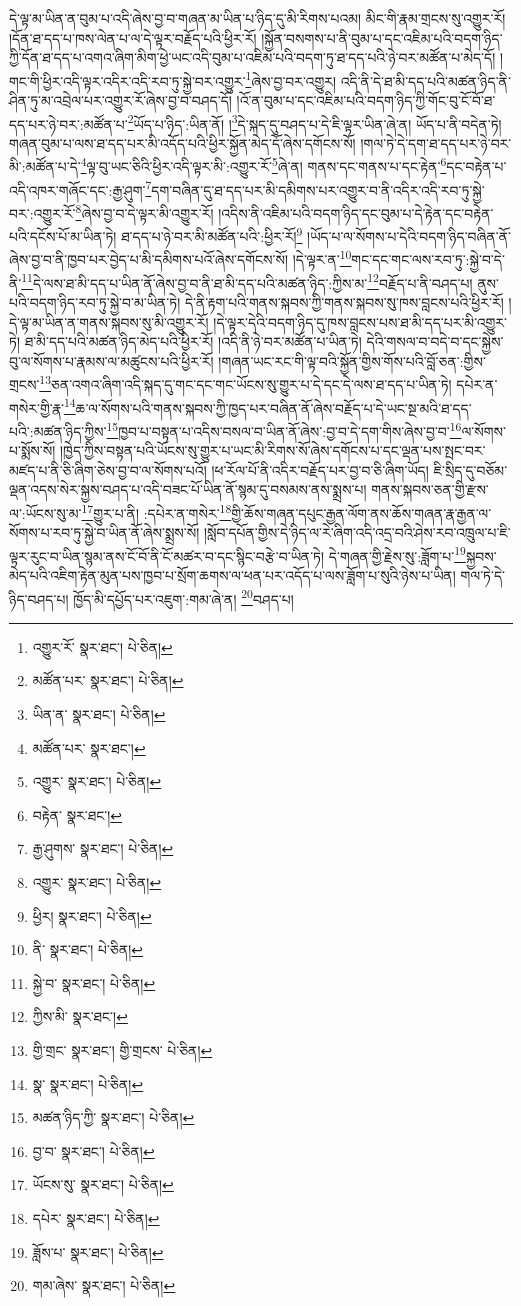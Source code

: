 དེ་ལྟ་མ་ཡིན་ན་བུམ་པ་འདི་ཞེས་བྱ་བ་གཞན་མ་ཡིན་པ་ཉིད་དུ་མི་རིགས་པའམ། མིང་གི་རྣམ་གྲངས་སུ་འགྱུར་རོ། །དོན་ཐ་དད་པ་ཁས་ལེན་པ་ལ་དེ་ལྟར་བརྗོད་པའི་ཕྱིར་རོ། །སྐྱོན་བསགས་པ་ནི་བུམ་པ་དང་འཇིམ་པའི་བདག་ཉིད་ཀྱི་དོན་ཐ་དད་པ་འགའ་ཞིག་མིག་ཕྱེ་ཡང་འདི་བུམ་པ་འཇིམ་པའི་བདག་ཏུ་ཐ་དད་པའི་ཉེ་བར་མཚོན་པ་མེད་དོ། །གང་གི་ཕྱིར་འདི་ལྟར་འདིར་འདི་རབ་ཏུ་སྐྱེ་བར་འགྱུར་\footnote{འགྱུར་རོ་  སྣར་ཐང་།  པེ་ཅིན། }ཞེས་བྱ་བར་འགྱུར། འདི་ནི་དེ་ཐ་མི་དད་པའི་མཚན་ཉིད་ནི་ཤིན་ཏུ་མ་འབྲེལ་པར་འགྱུར་རོ་ཞེས་བྱ་བ་བཤད་དོ། །འོ་ན་བུམ་པ་དང་འཇིམ་པའི་བདག་ཉིད་ཀྱི་གོང་བུ་ངོ་བོ་ཐ་དད་པར་ཉེ་བར་:མཚོན་པ་\footnote{མཚོན་པར་  སྣར་ཐང་།  པེ་ཅིན། }ཡོད་པ་ཉིད་:ཡིན་ནོ། །\footnote{ཡིན་ན་  སྣར་ཐང་།  པེ་ཅིན། }དེ་སྐད་དུ་བཤད་པ་དེ་ཇི་ལྟར་ཡིན་ཞེ་ན། ཡོད་པ་ནི་བདེན་ཏེ། གཞན་བུམ་པ་ལས་ཐ་དད་པར་མི་འདོད་པའི་ཕྱིར་སྐྱོན་མེད་དོ་ཞེས་དགོངས་སོ། །གལ་ཏེ་དེ་དག་ཐ་དད་པར་ཉེ་བར་མི་:མཚོན་པ་དེ་\footnote{མཚོན་པར་  སྣར་ཐང་། }ལྟ་བུ་ཡང་ཅིའི་ཕྱིར་འདི་ལྟར་མི་:འགྱུར་རོ་\footnote{འགྱུར་  སྣར་ཐང་།  པེ་ཅིན། }ཞེ་ན། གནས་དང་གནས་པ་དང་རྟེན་\footnote{བརྟེན་  སྣར་ཐང་། }དང་བརྟེན་པ་འདི་འཁར་གཞོང་དང་:རྒྱ་ཤུག་\footnote{རྒྱ་ཤུགས་  སྣར་ཐང་།  པེ་ཅིན། }དག་བཞིན་དུ་ཐ་དད་པར་མི་དམིགས་པར་འགྱུར་བ་ནི་འདིར་འདི་རབ་ཏུ་སྐྱེ་བར་:འགྱུར་རོ་\footnote{འགྱུར་  སྣར་ཐང་།  པེ་ཅིན། }ཞེས་བྱ་བ་དེ་ལྟར་མི་འགྱུར་རོ། །འདིས་ནི་འཇིམ་པའི་བདག་ཉིད་དང་བུམ་པ་དེ་རྟེན་དང་བརྟེན་པའི་དངོས་པོ་མ་ཡིན་ཏེ། ཐ་དད་པ་ཉེ་བར་མི་མཚོན་པའི་:ཕྱིར་རོ།\footnote{ཕྱིར།  སྣར་ཐང་།  པེ་ཅིན། } །ཡོད་པ་ལ་སོགས་པ་དེའི་བདག་ཉིད་བཞིན་ནོ་ཞེས་བྱ་བ་ནི་ཁྱབ་པར་བྱེད་པ་མི་དམིགས་པའོ་ཞེས་དགོངས་སོ། །དེ་ལྟར་ན་\footnote{ནི་  སྣར་ཐང་།  པེ་ཅིན། }གང་དང་གང་ལས་རབ་ཏུ་:སྐྱེ་བ་དེ་ནི་\footnote{སྐྱེ་བ་  སྣར་ཐང་།  པེ་ཅིན། }དེ་ལས་ཐ་མི་དད་པ་ཡིན་ནོ་ཞེས་བྱ་བ་ནི་ཐ་མི་དད་པའི་མཚན་ཉིད་:ཀྱིས་མ་\footnote{ཀྱིས་མི་  སྣར་ཐང་། }བརྗོད་པ་ནི་བཤད་པ། ནུས་པའི་བདག་ཉིད་རབ་ཏུ་སྐྱེ་བ་མ་ཡིན་ཏེ། དེ་ནི་རྟག་པའི་གནས་སྐབས་ཀྱི་གནས་སྐབས་སུ་ཁས་བླངས་པའི་ཕྱིར་རོ། །དེ་ལྟ་མ་ཡིན་ན་གནས་སྐབས་སུ་མི་འགྱུར་རོ། །དེ་ལྟར་དེའི་བདག་ཉིད་དུ་ཁས་བླངས་པས་ཐ་མི་དད་པར་མི་འགྱུར་ཏེ། ཐ་མི་དད་པའི་མཚན་ཉིད་མེད་པའི་ཕྱིར་རོ། །འདི་ནི་ཉེ་བར་མཚོན་པ་ཡིན་ཏེ། དེའི་གསལ་བ་བདེ་བ་དང་སྐྱེས་བུ་ལ་སོགས་པ་རྣམས་ལ་མཚུངས་པའི་ཕྱིར་རོ། །གཞན་ཡང་རང་གི་ལྟ་བའི་སྐྱོན་གྱིས་གོས་པའི་བློ་ཅན་:གྱིས་གྲངས་\footnote{གྱི་གྲང་  སྣར་ཐང་། གྱི་གྲངས་  པེ་ཅིན། }ཅན་འགའ་ཞིག་འདི་སྐད་དུ་གང་དང་གང་ཡོངས་སུ་གྱུར་པ་དེ་དང་དེ་ལས་ཐ་དད་པ་ཡིན་ཏེ། དཔེར་ན་གསེར་གྱི་རྣ་\footnote{སྣ་  སྣར་ཐང་།  པེ་ཅིན། }ཆ་ལ་སོགས་པའི་གནས་སྐབས་ཀྱི་ཁྱད་པར་བཞིན་ནོ་ཞེས་བརྗོད་པ་དེ་ཡང་སྔ་མའི་ཐ་དད་པའི་:མཚན་ཉིད་ཀྱིས་\footnote{མཚན་ཉིད་ཀྱི་  སྣར་ཐང་།  པེ་ཅིན། }ཁྱབ་པ་བསྟན་པ་འདིས་བསལ་བ་ཡིན་ནོ་ཞེས་:བྱ་བ་དེ་དག་གིས་ཞེས་བྱ་བ་\footnote{བྱ་བ་  སྣར་ཐང་།  པེ་ཅིན། }ལ་སོགས་པ་སྨོས་སོ། །ཁྱེད་ཀྱིས་བསྟན་པའི་ཡོངས་སུ་གྱུར་པ་ཡང་མི་རིགས་སོ་ཞེས་དགོངས་པ་དང་ལྡན་པས་སྤང་བར་མཛད་པ་ནི་ཅི་ཞིག་ཅེས་བྱ་བ་ལ་སོགས་པའོ། །ཕ་རོལ་པོ་ནི་འདིར་བརྗོད་པར་བྱ་བ་ཅི་ཞིག་ཡོད། ཇི་སྲིད་དུ་བཅོམ་ལྡན་འདས་སེར་སྐྱས་བཤད་པ་འདི་བཟང་པོ་ཡིན་ནོ་སྙམ་དུ་བསམས་ནས་སྨྲས་པ། གནས་སྐབས་ཅན་གྱི་རྫས་ལ་:ཡོངས་སུ་མ་\footnote{ཡོངས་སུ་  སྣར་ཐང་།  པེ་ཅིན། }གྱུར་པ་ནི། :དཔེར་ན་གསེར་\footnote{དཔེར་  སྣར་ཐང་།  པེ་ཅིན། }གྱི་ཆོས་གཞན་དཔུང་རྒྱན་ལོག་ནས་ཆོས་གཞན་རྣ་རྒྱན་ལ་སོགས་པ་རབ་ཏུ་སྐྱེ་བ་ཡིན་ནོ་ཞེས་སྨྲས་སོ། །སློབ་དཔོན་གྱིས་དེ་ཉིད་ལ་རེ་ཞིག་འདི་འདྲ་བའི་ཤེས་རབ་འཁྲུལ་པ་ཇི་ལྟར་རུང་བ་ཡིན་སྙམ་ནས་ངོ་བོ་ནི་ངོ་མཚར་བ་དང་སྙིང་བརྩེ་བ་ཡིན་ཏེ། དེ་གཞན་གྱི་རྗེས་སུ་:ཟློག་པ་\footnote{ཟློས་པ་  སྣར་ཐང་།  པེ་ཅིན། }སྐྱབས་མེད་པའི་འཇིག་རྟེན་མུན་པས་ཁྱབ་པ་སྲོག་ཆགས་ལ་ཕན་པར་འདོད་པ་ལས་ཟློག་པ་སུའི་ཉེས་པ་ཡིན། གལ་ཏེ་དེ་ཉིད་བཤད་པ། ཁྱོད་མི་དཔྱོད་པར་འཇུག་:གམ་ཞེ་ན། \footnote{གམ་ཞེས་  སྣར་ཐང་།  པེ་ཅིན། }བཤད་པ། 